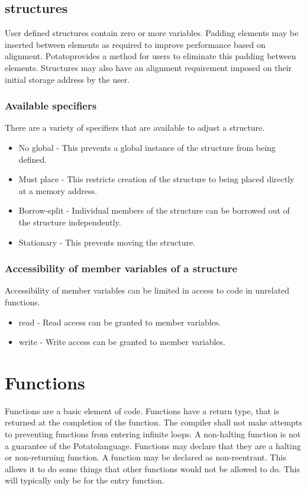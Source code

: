 \documentclass[12pt]{article}
\newcommand{\progLangNameSpace}{Potato\space }
\begin{document}
\subsection {structures}
User defined structures contain zero or more variables. Padding elements may be inserted between elements as required to improve performance based on alignment. \progLangNameSpace provides a method for users to eliminate this padding between elements. Structures may also have an alignment requirement imposed on their initial storage address by the user.

\subsubsection { Available specifiers }

There are a variety of specifiers that are available to adjust a structure.

\begin{itemize}
\item No global - This prevents a global instance of the structure from being defined.
\item Must place - This restricts creation of the structure to being placed directly at a memory address.
\item Borrow-split - Individual members of the structure can be borrowed out of the structure independently.
\item Stationary - This prevents moving the structure.
\end{itemize}

\subsubsection { Accessibility of member variables of a structure }

Accessibility of member variables can be limited in access to code in unrelated functions.
\begin{itemize}
\item read - Read access can be granted to member variables.
\item write - Write access can be granted to member variables.
\end{itemize}

\section{ Functions}

Functions are a basic element of code. Functions have a return type, that is returned at the completion of the function. 
The compiler shall not make attempts to preventing functions from entering infinite loops. 
A non-halting function is not a guarantee of the \progLangNameSpace language. 
Functions may declare that they are a halting or non-returning function.
A function may be declared as non-reentrant. This allows it to do some things that other functions would not be allowed to do.
This will typically only be for the entry function.
\end{document}
